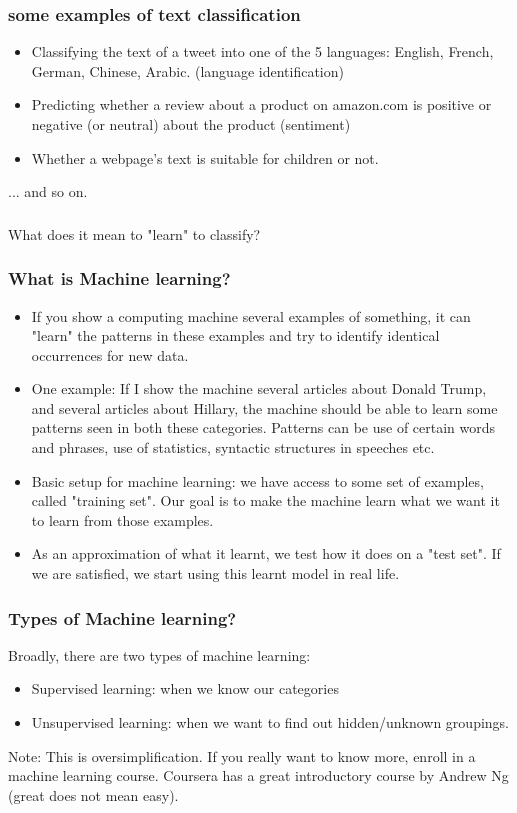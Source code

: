 \documentclass{beamer}
\begin{document}
\begin{frame}
\frametitle{some examples of text classification}
\begin{itemize}
\item Classifying the text of a tweet into one of the 5 languages: English, French, German, Chinese, Arabic. (language identification)
\item Predicting whether a review about a product on amazon.com is positive or negative (or neutral) about the product (sentiment)
\item Whether a webpage's text is suitable for children or not.
\end{itemize}
... and so on.
\end{frame}

\begin{frame}
\frametitle{}
\begin{center}
\Large What does it mean to "learn" to classify?
\end{center}
\end{frame}

\begin{frame}
\frametitle{What is Machine learning?}
\begin{itemize}
\item If you show a computing machine several examples of something, it can "learn" the patterns in these examples and try to identify identical occurrences for new data. \pause
\item One example: If I show the machine several articles about Donald Trump, and several articles about Hillary, the machine should be able to learn some patterns seen in both these categories. Patterns can be use of certain words and phrases, use of statistics, syntactic structures in speeches etc. \pause
\item Basic setup for machine learning: we have access to some set of examples, called "training set". Our goal is to make the machine learn what we want it to learn from those examples. \pause
\item As an approximation of what it learnt, we test how it does on a "test set". If we are satisfied, we start using this learnt model in real life. 
\end{itemize}
\end{frame}

\begin{frame}
\frametitle{Types of Machine learning?}
Broadly, there are two types of machine learning:
\begin{itemize}
\item Supervised learning: when we know our categories
\item Unsupervised learning: when we want to find out hidden/unknown groupings.
\end{itemize}
Note: This is oversimplification. If you really want to know more, enroll in a machine learning course. Coursera has a great introductory course by Andrew Ng (great does not mean easy).
\end{frame}
\end{document}
